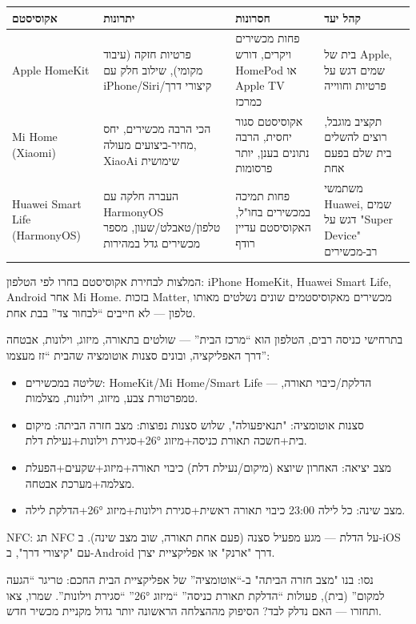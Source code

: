 \begin{center}
\begin{tabularx}{\linewidth}{|X|X|X|X|}
\hline
\textbf{אקוסיסטם} & \textbf{יתרונות} & \textbf{חסרונות} & \textbf{קהל יעד} \tabularnewline
\hline
Apple HomeKit & פרטיות חזקה (עיבוד מקומי), שילוב חלק עם iPhone/Siri/קיצורי דרך & פחות מכשירים ויקרים, דורש HomePod או Apple TV כמרכז & בית של Apple, שמים דגש על פרטיות וחווייה \tabularnewline
Mi Home (Xiaomi) & הכי הרבה מכשירים, יחס מחיר-ביצועים מעולה, XiaoAi שימושית & אקוסיסטם סגור יחסית, הרבה נתונים בענן, יותר פרסומות & תקציב מוגבל, רוצים להשלים בית שלם בפעם אחת \tabularnewline
Huawei Smart Life (HarmonyOS) & העברה חלקה עם HarmonyOS טלפון/טאבלט/שעון, מספר מכשירים גדל במהירות & פחות תמיכה במכשירים בחו"ל, האקוסיסטם עדיין רודף & משתמשי Huawei, שמים דגש על "Super Device" רב-מכשירים \tabularnewline
\hline
\end{tabularx}
\end{center}

\begin{tcbinfo}{המלצות לבחירת אקוסיסטם}
בחרו לפי הטלפון: iPhone HomeKit, Huawei Smart Life, Android אחר Mi Home. בזכות Matter, מכשירים מאקוסיסטמים שונים נשלטים מאותו טלפון — לא חייבים “לבחור צד” בבת אחת.

\end{tcbinfo}


בתרחישי כניסה רבים, הטלפון הוא “מרכז הבית” — שולטים בתאורה, מיזוג, וילונות, אבטחה דרך האפליקציה, ובונים סצנות אוטומציה שהבית “זז מעצמו”:

\begin{itemize}
  \item שליטה במכשירים: HomeKit/Mi Home/Smart Life — הדלקת/כיבוי תאורה, טמפרטורת צבע, מיזוג, וילונות, מצלמות.
  \item סצנות אוטומציה: "תנאיפעולה", שלוש סצנות נפוצות: מצב חזרה הביתה: מיקום בית+חשכה תאורת כניסה+מיזוג 26°+סגירת וילונות+נעילת דלת.
  \item מצב יציאה: האחרון שיוצא (מיקום/נעילת דלת) כיבוי תאורה+מיזוג+שקעים+הפעלת מצלמה+מערכת אבטחה.
  \item מצב שינה: כל לילה 23:00 כיבוי תאורה ראשית+סגירת וילונות+מיזוג 26°+הדלקת לילה.
\end{itemize}

NFC: תג NFC על הדלת — מגע מפעיל סצנה (פעם אחת תאורה, שוב מצב שינה). ב-iOS עם "קיצורי דרך", ב-Android דרך "ארנק" או אפליקציית יצרן.

\begin{tcbpractice}{נסו: בנו "מצב חזרה הביתה"}
ב-“אוטומציה” של אפליקציית הבית החכם: טריגר “הגעה למקום” (בית), פעולות “הדלקת תאורת כניסה” “מיזוג 26°” “סגירת וילונות”. שמרו, צאו ותחזרו — האם נדלק לבד? הסיפוק מההצלחה הראשונה יותר גדול מקניית מכשיר חדש.

\end{tcbpractice}

